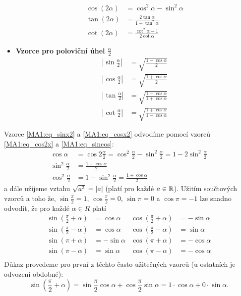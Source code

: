 \begin{itemize}
\begin{align}
          \cos(2\alpha)   &= \cos^2\alpha - \sin^2\alpha          \label{MA1:eq_cos2x} \\ 
          \tan(2\alpha)   &= \frac{2\tan\alpha}{1-\tan^2\alpha}   \label{MA1:eq_tan2x} \\ 
          \cot(2\alpha)   &= \frac{\cot^2\alpha - 1}{2\cot\alpha} \label{MA1:eq_cot2x}
        \end{align}
      \item \textbf{Vzorce pro poloviční úhel $\displaystyle\frac{\alpha}{2}$}
        \begin{align}
          \left|\sin\frac{\alpha}{2}\right|   
            &= \sqrt{\frac{1-\cos\alpha}{2}}                      \label{MA1:eq_sinx2} \\ 
          \left|\cos\frac{\alpha}{2}\right|   
            &= \sqrt{\frac{1+\cos\alpha}{2}}                      \label{MA1:eq_cosx2} \\ 
          \left|\tan\frac{\alpha}{2}\right|   
            &= \sqrt{\frac{1-\cos\alpha}{1+\cos\alpha}}           \label{MA1:eq_tanx2} \\ 
          \left|\cot\frac{\alpha}{2}\right|   
            &= \sqrt{\frac{1+\cos\alpha}{1-\cos\alpha}}           \label{MA1:eq_cotx2}
        \end{align}
    \end{itemize}
    Vzorce \ref{MA1:eq_sinx2} a \ref{MA1:eq_cosx2} odvodíme pomocí vzorců \ref{MA1:eq_cos2x} a \ref{MA1:eq_sincos}:
    \begin{align*}
      \cos\alpha &= 
      \cos2\frac{\alpha}{2}=\cos^2\frac{\alpha}{2}-\sin^2\frac{\alpha}{2}=1-2\sin^2\frac{\alpha}{2} \\
      \sin^2\frac{\alpha}{2} &= \frac{1-\cos\alpha}{2}   \\
      \cos^2\frac{\alpha}{2} &= 1 - \sin^2\frac{\alpha}{2} = \frac{1+\cos\alpha}{2} 
    \end{align*}
    a dále užijeme vztahu $\sqrt{a^2}=|a|$ (platí pro každé $a\in\mathbb{R}$). Užitím součtových vzorců a toho že, 
	$\sin\frac{\pi}{2} = 1$, $\cos\frac{\pi}{2} = 0$, $\sin\pi = 0$ a $\cos\pi = -1$ lze snadno odvodit, 
	že pro každé $\alpha\in R$ platí
    \begin{align*}
      \sin\left(\frac{\pi}{2}+\alpha\right) &=  \cos\alpha  &   \cos\left(\frac{\pi}{2}+\alpha\right) &= -\sin\alpha \\
      \sin\left(\frac{\pi}{2}-\alpha\right) &=  \cos\alpha  &   \cos\left(\frac{\pi}{2}-\alpha\right) &=  \sin\alpha \\
      \sin\left(\pi+\alpha\right)           &= -\sin\alpha  &   \cos\left(\pi+\alpha\right)           &= -\cos\alpha \\
      \sin\left(\pi-\alpha\right)           &=  \sin\alpha  &   \cos\left(\pi-\alpha\right)           &= -\cos\alpha \\
    \end{align*}
    \newline Důkaz provedeme pro první z těchto často užitečných vzorců (u ostatních je odvození obdobné):
    $$\sin\left(\frac{\pi}{2}+\alpha\right) = \sin\frac{\pi}{2}\cos\alpha + \cos\frac{\pi}{2}\sin\alpha = 1\cdot\cos\alpha + 0\cdot\sin\alpha.$$
